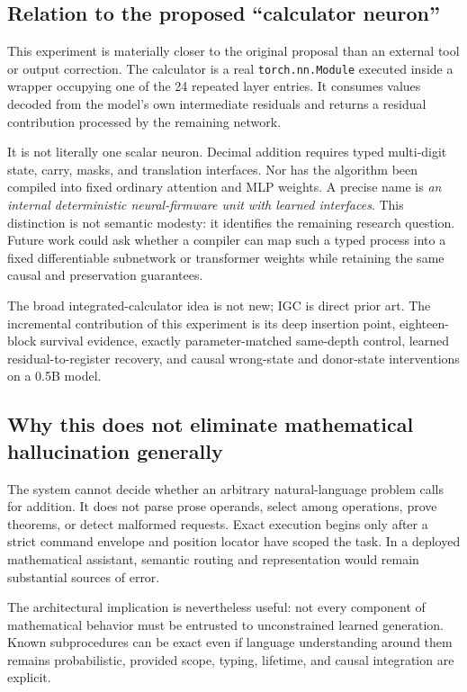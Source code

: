 \documentclass[11pt]{article}
\newcommand{\code}[1]{\texttt{#1}}
\begin{document}
\subsection{Relation to the proposed ``calculator neuron''}

This experiment is materially closer to the original proposal than an
external tool or output correction. The calculator is a real
\code{torch.nn.Module} executed inside a wrapper occupying one of the 24
repeated layer entries. It consumes values decoded from the model's own
intermediate residuals and returns a residual contribution processed by the
remaining network.

It is not literally one scalar neuron. Decimal addition requires typed
multi-digit state, carry, masks, and translation interfaces. Nor has the
algorithm been compiled into fixed ordinary attention and MLP weights. A
precise name is \emph{an internal deterministic neural-firmware unit with
learned interfaces}. This distinction is not semantic modesty: it identifies
the remaining research question. Future work could ask whether a compiler can
map such a typed process into a fixed differentiable subnetwork or transformer
weights while retaining the same causal and preservation guarantees.

The broad integrated-calculator idea is not new; IGC is direct prior art. The
incremental contribution of this experiment is its deep insertion point,
eighteen-block survival evidence, exactly parameter-matched same-depth
control, learned residual-to-register recovery, and causal wrong-state and
donor-state interventions on a 0.5B model.

\subsection{Why this does not eliminate mathematical hallucination generally}

The system cannot decide whether an arbitrary natural-language problem calls
for addition. It does not parse prose operands, select among operations, prove
theorems, or detect malformed requests. Exact execution begins only after a
strict command envelope and position locator have scoped the task. In a
deployed mathematical assistant, semantic routing and representation would
remain substantial sources of error.

The architectural implication is nevertheless useful: not every component of
mathematical behavior must be entrusted to unconstrained learned generation.
Known subprocedures can be exact even if language understanding around them
remains probabilistic, provided scope, typing, lifetime, and causal integration
are explicit.
\end{document}
